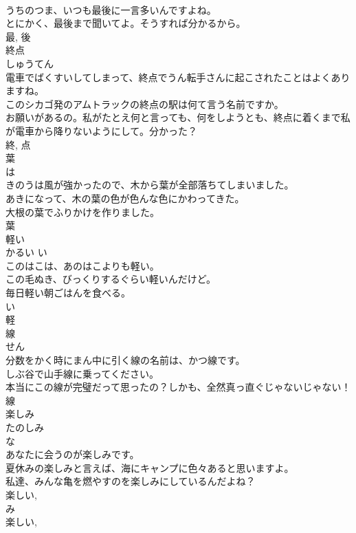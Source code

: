 \documentclass[8pt]{extreport}
\begin{document}
\begin{CJK}{UTF8}{min}
\\	うちのつま、いつも最後に一言多いんですよね。	
\\	とにかく、最後まで聞いてよ。そうすれば分かるから。	
\\	最, 後	
\\	終点	
\\	しゅうてん	
\\	電車でばくすいしてしまって、終点でうん転手さんに起こされたことはよくありますね。	
\\	このシカゴ発のアムトラックの終点の駅は何て言う名前ですか。	
\\	お願いがあるの。私がたとえ何と言っても、何をしようとも、終点に着くまで私が電車から降りないようにして。分かった？	
\\	終, 点	
\\	葉	
\\	は	
\\	きのうは風が強かったので、木から葉が全部落ちてしまいました。	
\\	あきになって、木の葉の色が色んな色にかわってきた。	
\\	大根の葉でふりかけを作りました。	
\\	葉	
\\	軽い	
\\	かるい	い 
\\	このはこは、あのはこよりも軽い。	
\\	この毛ぬき、びっくりするぐらい軽いんだけど。	
\\	毎日軽い朝ごはんを食べる。	
\\	い 
\\	軽	
\\	線	
\\	せん	
\\	分数をかく時にまん中に引く線の名前は、かつ線です。	
\\	しぶ谷で山手線に乗ってください。	
\\	本当にこの線が完璧だって思ったの？しかも、全然真っ直ぐじゃないじゃない！	
\\	線	
\\	楽しみ	
\\	たのしみ	
\\	な 
\\	あなたに会うのが楽しみです。	
\\	夏休みの楽しみと言えば、海にキャンプに色々あると思いますよ。	
\\	私達、みんな亀を燃やすのを楽しみにしているんだよね？	
\\	楽しい, 
\\	み 
\\	楽しい, 

\end{CJK}
\end{document}
